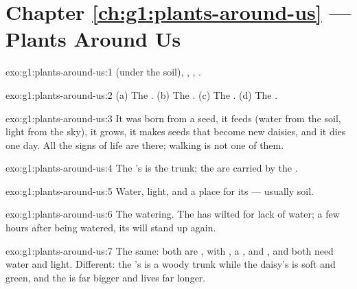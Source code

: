 \section*{Chapter \ref{ch:g1:plants-around-us} --- Plants Around Us}

\begin{solution}{exo:g1:plants-around-us:1}
 (under the soil), , , .
\end{solution}

\begin{solution}{exo:g1:plants-around-us:2}
(a) The . (b) The . (c) The . (d) The .
\end{solution}

\begin{solution}{exo:g1:plants-around-us:3}
It was born from a seed, it feeds (water from the soil, light from
the sky), it grows, it makes seeds that become new daisies, and it
dies one day. All the signs of life are there; walking is not one
of them.
\end{solution}

\begin{solution}{exo:g1:plants-around-us:4}
The 's  is the trunk; the  are carried by the
.
\end{solution}

\begin{solution}{exo:g1:plants-around-us:5}
Water, light, and a place for its  --- usually soil.
\end{solution}

\begin{solution}{exo:g1:plants-around-us:6}
The watering. The  has wilted for lack of water; a few hours
after being watered, its  will stand up again.
\end{solution}

\begin{solution}{exo:g1:plants-around-us:7}
The same: both are , with , a ,  and ,
and both need water and light. Different: the 's  is a
woody trunk while the daisy's  is soft and green, and the 
is far bigger and lives far longer.
\end{solution}

